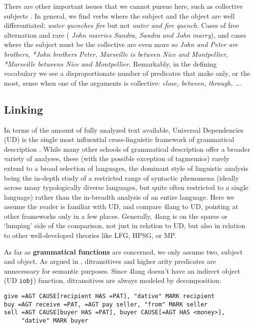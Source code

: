 \documentclass[11pt,bookmarks,bookmarksnumbered,naturalnames,plainpages=false,pdftex,colorlinks=true,urlcolor=blue,bookmarksdepth=subsection,plainpages=false]{paper}
\begin{document}
There are other important issues that we cannot pursue here, such as
collective subjects \citep{Scha:1981}. In general, we find verbs where the
subject and the object are well differentiated: {\it water quenches fire} but
not {\it *water and fire quench}. Cases of free alternation and rare ({\it
  John marries Sandra, Sandra and John marry}), and cases where the subject
must be the collective are even more so {\it John and Peter are brothers,
  *John brothers Peter, Marseille is between Nice and Montpellier, *Marseille
  betweens Nice and Montpellier}. Remarkably, in the defining vocabulary we
see a disproportionate number of predicates that make only, or the most, sense
when one of the arguments is collective: {\it close, between, through,
  \ldots}.


\subsection{Linking}\label{linking}

In terms of the amount of fully analyzed text available, Universal
Dependencies (UD) is the single most influential cross-linguistic framework of
grammatical description \citep{Nivre:2018s}. While many other schools of
grammatical description offer a broader variety of analyses, these (with the
possible exception of tagmemics) rarely extend to a broad selection of
languages, the dominant style of linguistic analysis being the in-depth study
of a restricted range of syntactic phenomena (ideally across many
typologically diverse languages, but quite often restricted to a single
language) rather than the in-breadth analysis of an entire language. Here we
assume the reader is familiar with UD, and compare 4lang to UD, pointing at
other frameworks only in a few places. Generally, 4lang is on the sparse or
`lumping' side of the comparison, not just in relation to UD, but also in
relation to other well-developed theories like LFG, HPSG, or MP.

As far as {\bf grammatical functions} are concerned, we only assume two,
subject and object. As argued in \citep{Kornai:2012}, ditransitives and higher
arity predicates are unnecessary for semantic purposes. Since 4lang doesn't
have an indirect object (UD {\tt iobj}) function, ditransitives are always
modeled by decomposition:

\begin{verbatim}
give =AGT CAUSE[recipient HAS =PAT], "dative" MARK recipient
buy =AGT receive =PAT, =AGT pay seller, "from" MARK seller
sell =AGT CAUSE[buyer HAS =PAT], buyer CAUSE[=AGT HAS <money>], 
     "dative" MARK buyer
\end{verbatim}
\end{document}
